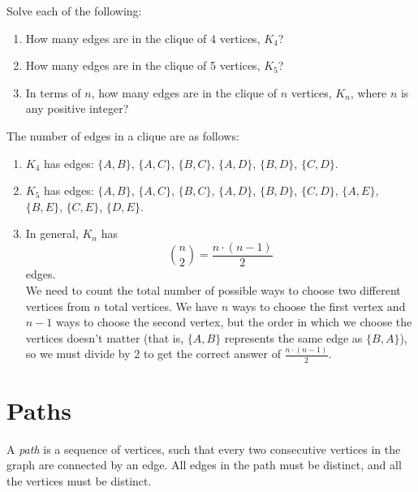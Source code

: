\documentclass[11pt]{article}
\begin{document}
\begin{problem} %
Solve each of the following:
\begin{enumerate}[label=(\alph*)]
\item How many edges are in the clique of 4 vertices, $K_4$?
\item How many edges are in the clique of 5 vertices, $K_5$?
\item In terms of $n$, how many edges are in the clique of $n$ vertices, $K_n$, where $n$ is any positive integer?
\end{enumerate}
\end{problem}

\begin{solution} 
The number of edges in a clique are as follows:
\begin{enumerate}[label=(\alph*)]
\item $K_4$ has  edges: $\{A, B\}$, $\{A, C\}$, $\{B, C\}$, $\{A, D\}$, $\{B, D\}$, $\{C, D\}$.
\item $K_5$ has  edges: $\{A, B\}$, $\{A, C\}$, $\{B, C\}$, $\{A, D\}$, $\{B, D\}$, $\{C, D\}$, $\{A, E\}$, $\{B, E\}$, $\{C, E\}$, $\{D,E\}$.
\item In general, $K_n$ has
\[\binom{n}{2} = \boxed{\frac{n \cdot (n - 1)}{2}}\]
edges. \\
We need to count the total number of possible ways to choose two different vertices from $n$ total vertices. We have $n$ ways to choose the first vertex
and $n - 1$ ways to choose the second vertex, but the order in which we choose the vertices doesn't matter (that is, $\{A,B\}$ represents the same edge
as $\{B, A\}$), so we must divide by 2 to get the correct answer of $\frac{n \cdot (n - 1)}{2}$.
\end{enumerate}
\end{solution}

\section{Paths}

\begin{definition}
\label{def:path}
A \textit{path} is a sequence of vertices, such that every two consecutive vertices in the graph are connected by an edge.
All edges in the path must be distinct, and all the vertices must be distinct.
\end{definition}
\end{document}
